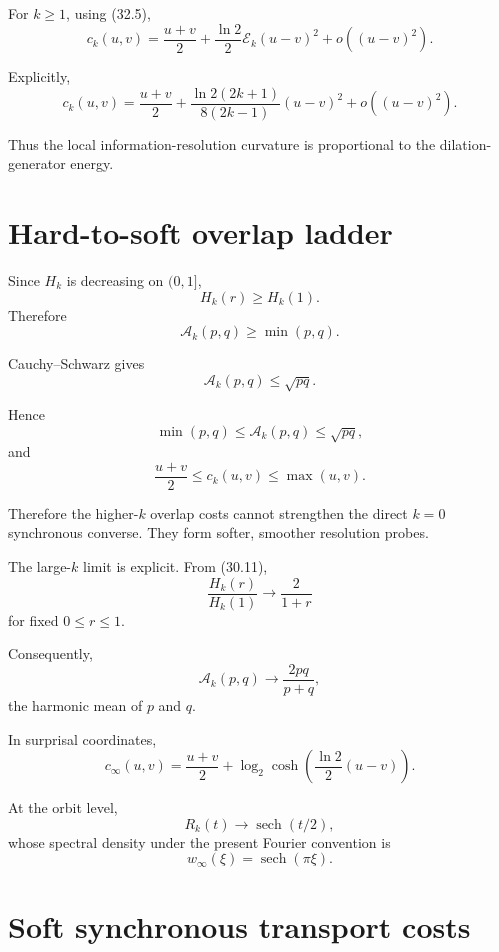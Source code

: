 \documentclass[11pt,a4paper]{article}
\newcommand{\1}{\mathbf 1}
\begin{document}
For \(k\ge1\), using (32.5),
\[
\boxed{
c_k(u,v)
=
\frac{u+v}{2}
+
\frac{\ln2}{2}\mathcal E_k(u-v)^2
+
o((u-v)^2).
}
\tag{33.8}
\]

Explicitly,
\[
\boxed{
c_k(u,v)
=
\frac{u+v}{2}
+
\frac{\ln2(2k+1)}{8(2k-1)}
(u-v)^2
+
o((u-v)^2).
}
\tag{33.9}
\]

Thus the local information-resolution curvature is proportional to the
dilation-generator energy.


\section{Hard-to-soft overlap ladder}

Since \(H_k\) is decreasing on \((0,1]\),
\[
H_k(r)\ge H_k(1).
\]
Therefore
\[
\mathcal A_k(p,q)\ge\min(p,q).
\tag{34.1}
\]

Cauchy--Schwarz gives
\[
\mathcal A_k(p,q)\le\sqrt{pq}.
\tag{34.2}
\]

Hence
\[
\boxed{
\min(p,q)
\le
\mathcal A_k(p,q)
\le
\sqrt{pq},
}
\tag{34.3}
\]
and
\[
\boxed{
\frac{u+v}{2}
\le
c_k(u,v)
\le
\max(u,v).
}
\tag{34.4}
\]

Therefore the higher-\(k\) overlap costs cannot strengthen the direct
\(k=0\) synchronous converse.
They form softer, smoother resolution probes.

The large-\(k\) limit is explicit.
From (30.11),
\[
\boxed{
\frac{H_k(r)}{H_k(1)}
\longrightarrow
\frac{2}{1+r}
}
\tag{34.5}
\]
for fixed \(0\le r\le1\).

Consequently,
\[
\boxed{
\mathcal A_k(p,q)
\longrightarrow
\frac{2pq}{p+q},
}
\tag{34.6}
\]
the harmonic mean of \(p\) and \(q\).

In surprisal coordinates,
\[
\boxed{
c_\infty(u,v)
=
\frac{u+v}{2}
+
\log_2
\cosh
\left(
\frac{\ln2}{2}(u-v)
\right).
}
\tag{34.7}
\]

At the orbit level,
\[
\boxed{
R_k(t)\longrightarrow\operatorname{sech}(t/2),
}
\tag{34.8}
\]
whose spectral density under the present Fourier convention is
\[
\boxed{
w_\infty(\xi)=\operatorname{sech}(\pi\xi).
}
\tag{34.9}
\]


\section{Soft synchronous transport costs}
\end{document}
